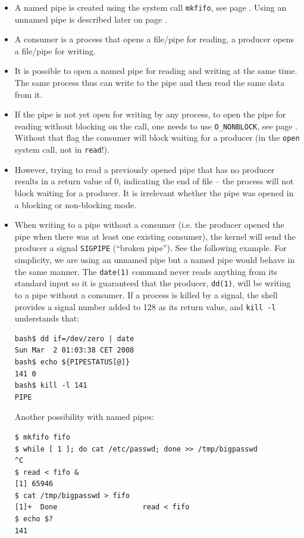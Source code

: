 \begin{itemize}
\item A named pipe is created using the system call \texttt{mkfifo}, see page
\pageref{MKFIFO}.  Using an unnamed pipe is described later on page
\pageref{PIPE}.
\item A consumer is a process that opens a file/pipe for reading, a producer
opens a file/pipe for writing.
\item It is possible to open a named pipe for reading and writing at the same
time.  The same process thus can write to the pipe and then read the same data
from it.
\item If the pipe is not yet open for writing by any process, to open the pipe
for reading without blocking on the call, one needs to use \texttt{O\_NONBLOCK},
see page \pageref{O_NONBLOCK}.  Without that flag the consumer will block
waiting for a producer (in the \texttt{open} system call, not in
\texttt{read}!).
\item However, trying to read a previously opened pipe that has no producer
results in a return value of 0, indicating the end of file -- the process will
not block waiting for a producer.  It is irrelevant whether the pipe was opened
in a blocking or non-blocking mode.
\item When writing to a pipe without a consumer (i.e. the producer opened the
pipe when there was at least one existing consumer), the kernel will send the
producer a signal \texttt{SIGPIPE} (``broken pipe'').  See the following
example.  For simplicity, we are using an unnamed pipe but a named pipe
would behave in the same manner.  The \texttt{date(1)} command never
reads anything from its standard input so it is guaranteed that the producer,
\texttt{dd(1)}, will be writing to a pipe without a consumer.  If a process is
killed by a signal, the shell provides a signal number added to 128 as its
return value, and \texttt{kill -l} understands that:

\begin{verbatim}
bash$ dd if=/dev/zero | date
Sun Mar  2 01:03:38 CET 2008
bash$ echo ${PIPESTATUS[@]}
141 0
bash$ kill -l 141
PIPE
\end{verbatim}

Another possibility with named pipes:

\begin{verbatim}
$ mkfifo fifo
$ while [ 1 ]; do cat /etc/passwd; done >> /tmp/bigpasswd
^C
$ read < fifo &
[1] 65946
$ cat /tmp/bigpasswd > fifo
[1]+  Done                    read < fifo
$ echo $?
141
\end{verbatim}


\end{itemize}
